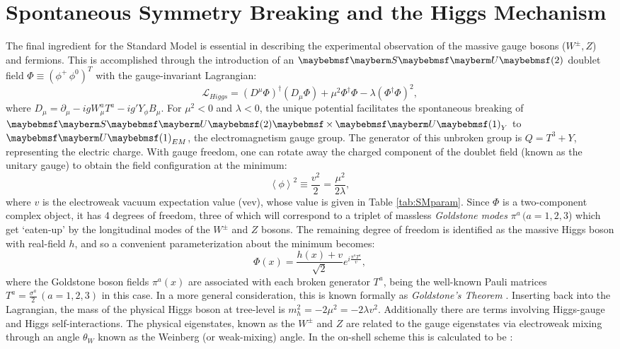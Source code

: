 \section{Spontaneous Symmetry Breaking and the Higgs Mechanism}
\label{sec:higgsmech}

The final ingredient for the Standard Model is essential in describing the experimental observation of the massive gauge bosons ($W^{\pm},Z$) and fermions. This is accomplished through the introduction of an $\SUgroup{2}$ doublet field $\Phi \equiv (\phi^+\,\phi^0)^{T}$ with the gauge-invariant Lagrangian:
\begin{equation}
\mathcal{L}_{Higgs}=(D^{\mu}\Phi)^{\dagger}(D_{\mu}\Phi)+\mu^2 \Phi^{\dagger}\Phi-\lambda \left(\Phi^{\dagger} \Phi \right)^2,
\end{equation}
where $D_{\mu}=\partial_{\mu}-igW_{\mu}^{a}T^{a}-ig'Y_{\phi}B_{\mu}$. For $\mu^2<0$ and $\lambda<0$, the unique potential facilitates the spontaneous breaking of $\SUgroup{2} \times \Ugroup{1}_{Y}$ to $\Ugroup{1}_{EM}$, the electromagnetism gauge group. The generator of this unbroken group is $Q=T^3 + Y$, representing the electric charge. With gauge freedom, one can rotate away the charged component of the doublet field (known as the unitary gauge) to obtain the field configuration at the minimum:
\begin{equation}
\left\langle \phi \right\rangle ^2\equiv \frac{v^2}{2}=\frac{\mu^2}{2\lambda},
\end{equation}
where $v$ is the electroweak vacuum expectation value (\acrshort{vev}), whose value is given in Table \ref{tab:SMparam}. Since $\Phi$ is a two-component complex object, it has 4 degrees of freedom, three of which will correspond to a triplet of massless \textit{Goldstone modes} $\pi^{a}\,(a=1,2,3$) which get `eaten-up' by the longitudinal modes of the $W^{\pm}$ and $Z$ bosons. The remaining degree of freedom is identified as the massive Higgs boson with real-field $h$, and so a convenient parameterization about the minimum becomes:
\begin{equation}
\Phi(x)=\frac{h(x)+v}{\sqrt{2}}e^{i\frac{\pi^{a}T^{a}}{v}},
\label{eqn:higgsvevparam}
\end{equation}
where the Goldstone boson fields $\pi^{a}(x)$ are associated with each broken generator $T^a$, being the well-known Pauli matrices $T^a=\frac{\sigma^{a}}{2} \,(a=1,2,3)$ in this case. In a more general consideration, this is known formally as \textit{Goldstone's Theorem} \cite{RN299}. Inserting back into the Lagrangian, the mass of the physical Higgs boson at tree-level is $m^2_h=-2 \mu^2=-2\lambda v^2$. Additionally there are terms involving Higgs-gauge and Higgs self-interactions. The physical eigenstates, known as the $W^{\pm}$ and $Z$ are related to the gauge eigenstates via electroweak mixing through an angle $\theta_W$ known as the Weinberg (or weak-mixing) angle. In the on-shell scheme this is calculated to be \cite{RN496}:
